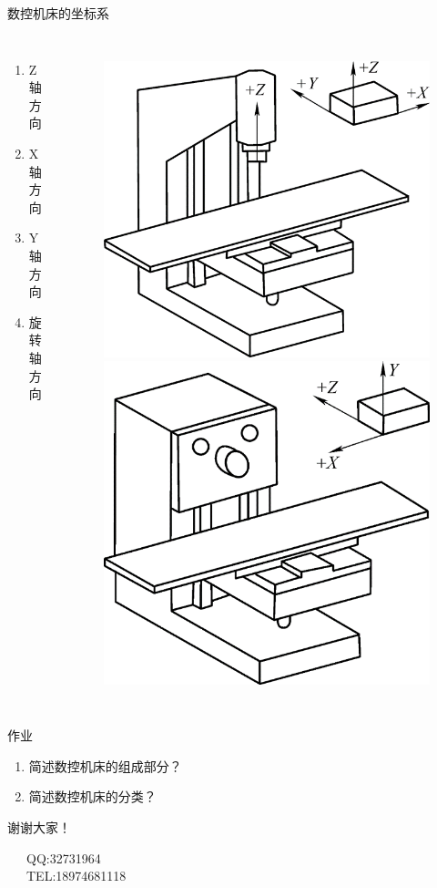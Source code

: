 \documentclass[UTF8,zihao=-4]{ctexbeamer}
\begin{document}
\begin{frame}{数控机床的坐标系}
\begin{columns}
	\begin{enumerate}
		\item Z轴方向
		\item X轴方向 
		\item Y轴方向
		\item 旋转轴方向
	\end{enumerate} 
	\begin{figure}
		\centering
		\includegraphics[width= 0.5\linewidth]{image/1-23}
		\includegraphics[width= 0.5\linewidth]{image/1-24}
		\label{fig:1-24}
	\end{figure}
\end{columns}
\end{frame}




\begin{frame}{作业}
\begin{enumerate}
	\item 简述数控机床的组成部分？
	\item 简述数控机床的分类？
\end{enumerate}
\end{frame}

\begin{frame}[plain]
\vfill

\centering \huge 谢谢大家！

\vfill

\flushleft \footnotesize   
~~~QQ:32731964\\
~~~TEL:18974681118\\

\end{frame}
\end{document}
